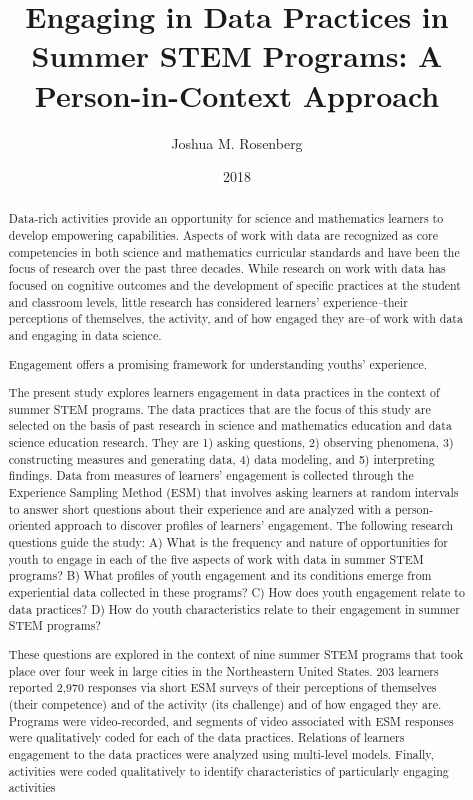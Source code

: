 \documentclass[]{msu-thesis}
\title{Engaging in Data Practices in Summer STEM Programs: A Person-in-Context Approach
}
\author{Joshua M. Rosenberg}
\date{2018}
\theoremstyle{definition}
\theoremstyle{definition}
\theoremstyle{definition}
\theoremstyle{remark}
\begin{document}

\maketitlepage
\begin{abstract}
Data-rich activities provide an opportunity for science and mathematics learners to develop empowering capabilities. Aspects of work with data are recognized as core competencies in both science and mathematics curricular standards and have been the focus of research over the past three decades. While research on work with data has focused on cognitive outcomes and the development of specific practices at the student and classroom levels, little research has considered learners' experience--their perceptions of themselves, the activity, and of how engaged they are--of work with data and engaging in data science.

Engagement offers a promising framework for understanding youths' experience.

The present study explores learners engagement in data practices in the context of summer STEM programs. The data practices that are the focus of this study are selected on the basis of past research in science and mathematics education and data science education research. They are 1) asking questions, 2) observing phenomena, 3) constructing measures and generating data, 4) data modeling, and 5) interpreting findings. Data from measures of learners' engagement is collected through the Experience Sampling Method (ESM) that involves asking learners at random intervals to answer short questions about their experience and are analyzed with a person-oriented approach to discover profiles of learners' engagement. The following research questions guide the study: A) What is the frequency and nature of opportunities for youth to engage in each of the five aspects of work with data in summer STEM programs? B) What profiles of youth engagement and its conditions emerge from experiential data collected in these programs? C) How does youth engagement relate to data practices? D) How do youth characteristics relate to their engagement in summer STEM programs?

These questions are explored in the context of nine summer STEM programs that took place over four week in large cities in the Northeastern United States. 203 learners reported 2,970 responses via short ESM surveys of their perceptions of themselves (their competence) and of the activity (its challenge) and of how engaged they are. Programs were video-recorded, and segments of video associated with ESM responses were qualitatively coded for each of the data practices. Relations of learners engagement to the data practices were analyzed using multi-level models. Finally, activities were coded qualitatively to identify characteristics of particularly engaging activities


\end{abstract}
\end{document}
